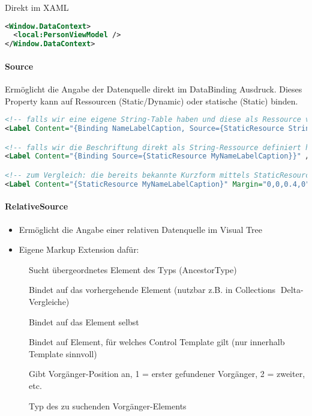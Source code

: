 Direkt im XAML
\begin{lstlisting}[language=xml]
<Window.DataContext>
  <local:PersonViewModel />
</Window.DataContext>
\end{lstlisting}

\paragraph{Source} Ermöglicht die Angabe der Datenquelle direkt im DataBinding Ausdruck. Dieses Property kann auf Ressourcen (Static/Dynamic) oder statische (Static) binden.
\begin{lstlisting}[language=xml]
<!-- falls wir eine eigene String-Table haben und diese als Ressource verfügbar ist --> 
<Label Content="{Binding NameLabelCaption, Source={StaticResource Strings}}" /> 

<!-- falls wir die Beschriftung direkt als String-Ressource definiert haben--> 
<Label Content="{Binding Source={StaticResource MyNameLabelCaption}}" /> 

<!-- zum Vergleich: die bereits bekannte Kurzform mittels StaticResource-Markup Extension --> 
<Label Content="{StaticResource MyNameLabelCaption}" Margin="0,0,0.4,0" /> 
\end{lstlisting}

\paragraph{RelativeSource} 
\begin{itemize}
    \item Ermöglicht die Angabe einer relativen Datenquelle im Visual Tree
    \item Eigene Markup Extension dafür: 
\end{itemize}

\begin{description}
    \item[] Sucht übergeordnetes Element des Typs (AncestorType) 
    \item[] Bindet auf das vorhergehende Element (nutzbar z.B. in Collections Delta-Vergleiche) 
    \item[] Bindet auf das Element selbst 
    \item[] Bindet auf Element, für welches Control Template gilt (nur innerhalb Template sinnvoll) 
    \item[] Gibt Vorgänger-Position an, 1 = erster gefundener Vorgänger, 2 = zweiter, etc. 
    \item[] Typ des zu suchenden Vorgänger-Elements 
\end{description}

